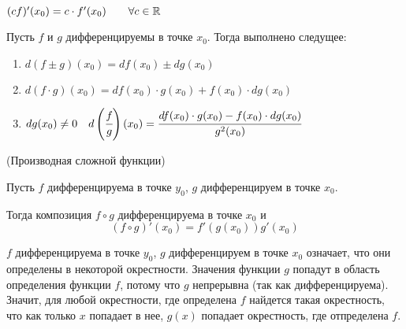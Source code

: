 \begin{corollary}
    $ (cf)'(x_{0}) = c\cdot f'(x_{0}) \quad \quad \forall c \in \mathbb{R}
    $
\end{corollary}
\begin{corollary}
    Пусть $f$ и $g$ дифференцируемы в точке $x_{0}$. Тогда выполнено следущее:
    \begin{enumerate}
        \item $  d(f \pm g)(x_{0}) = df(x_{0}) \pm dg({x_{0}}) $
        \item  $ d(f \cdot g)(x_{0}) = df(x_{0}) \cdot g({x_{0}}) + f(x_{0}) \cdot dg({x_{0}})$
        \item $dg(x_{0}) \neq 0 \quad d\left(\cfrac{f}{g}\right) (x_{0}) = \cfrac{df(x_{0}) \cdot g({x_{0}}) - f(x_{0}) \cdot dg({x_{0}})}{g^{2}(x_{0})}$
    \end{enumerate}
\end{corollary}
\begin{theorem}
    \hypertarget{thrm5.10}{(Производная сложной функции)} Пусть $f$ дифференцируема в точке $y_{0}$, $g$ дифференцируем в точке $x_{0}$.

    Тогда композиция $f \circ g$ дифференцируема в точке $x_{0} $ и
    $$
    (f\circ g)'(x_{0}) = f'(g(x_{0})) g'(x_{0})
    $$
\end{theorem}
\begin{note}
     $f$ дифференцируема в точке $y_{0}$, $g$ дифференцируем в точке $x_{0}$ означает, что они определены в некоторой окрестности. Значения функции $g$ попадут в область определения функции $f$, потому что $g$ непрерывна (так как дифференцируема). Значит, для любой окрестности, где определена $f$ найдется такая окрестность, что как только $x$ попадает в нее, $g(x)$ попадает окрестность, где отпределена $f$.
\end{note}
